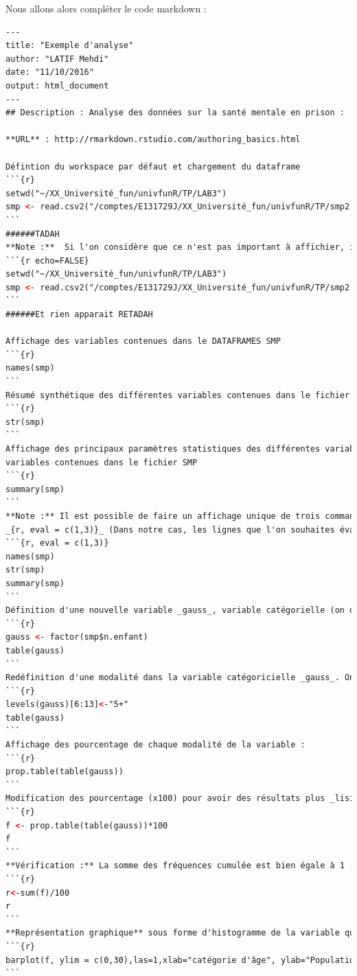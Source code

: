 Nous allons alors compléter le code markdown : 

\begin{lstlisting}[language=html]
---
title: "Exemple d'analyse"
author: "LATIF Mehdi"
date: "11/10/2016"
output: html_document
---
## Description : Analyse des données sur la santé mentale en prison : 

**URL** : http://rmarkdown.rstudio.com/authoring_basics.html

Défintion du workspace par défaut et chargement du dataframe
```{r}
setwd("~/XX_Université_fun/univfunR/TP/LAB3")
smp <- read.csv2("/comptes/E131729J/XX_Université_fun/univfunR/TP/smp2.csv")
```
######TADAH
**Note :**  Si l'on considère que ce n'est pas important à affichier, il suffit d'écrire dans le chunk echo = FALSE
```{r echo=FALSE}
setwd("~/XX_Université_fun/univfunR/TP/LAB3")
smp <- read.csv2("/comptes/E131729J/XX_Université_fun/univfunR/TP/smp2.csv")
```
######Et rien apparait RETADAH

Affichage des variables contenues dans le DATAFRAMES SMP
```{r}
names(smp)
```
Résumé synthétique des différentes variables contenues dans le fichier SMP
```{r}
str(smp)
```
Affichage des principaux paramètres statistiques des différentes variables contenues dans le fichier SMP
variables contenues dans le fichier SMP
```{r}
summary(smp)
```
**Note :** Il est possible de faire un affichage unique de trois commandes dans un même _chunk_ : pour cela, il faut ecrire : 
_{r, eval = c(1,3)}_ (Dans notre cas, les lignes que l'on souhaites évaluer sont les lignes de commandes 1 et 3) :
```{r, eval = c(1,3)}
names(smp)
str(smp)
summary(smp)
```
Définition d'une nouvelle variable _gauss_, variable catégorielle (on dit aussi qualitative) ou **l'âge des enfants est une modalité**
```{r}
gauss <- factor(smp$n.enfant)
table(gauss)
```
Redéfinition d'une modalité dans la variable catégoricielle _gauss_. On concatène les âges supérieurs à 6 ans et on les rassemble dans une même modalité : 
```{r}
levels(gauss)[6:13]<-"5+"
table(gauss)
```
Affichage des pourcentage de chaque modalité de la variable : 
```{r}
prop.table(table(gauss))
```
Modification des pourcentage (x100) pour avoir des résultats plus _lisibles_ : 
```{r}
f <- prop.table(table(gauss))*100
f
```
**Vérification :** La somme des fréquences cumulée est bien égale à 1 :
```{r}
r<-sum(f)/100
r
```
**Représentation graphique** sous forme d'histogramme de la variable qualitative _gauss_
```{r}
barplot(f, ylim = c(0,30),las=1,xlab="catégorie d'âge", ylab="Population")
```
\end{lstlisting}

